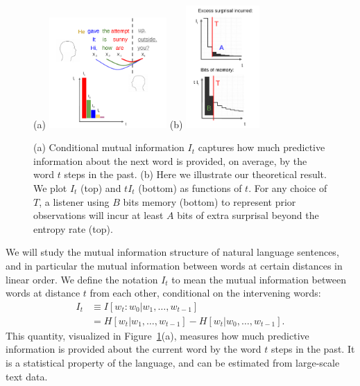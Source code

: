 \begin{figure}
	(a)
\includegraphics[width=0.4\textwidth]{figures-gdrive/mi-distance.pdf}
	(b)
\includegraphics[width=0.25\textwidth]{figures-gdrive/theorem.pdf}
	\caption{
		(a) Conditional mutual information $I_t$ captures how much predictive information about the next word is provided, on average, by the word $t$ steps in the past.
		(b) Here we illustrate our theoretical result. We plot $I_t$ (top) and $tI_t$ (bottom) as functions of $t$. For any choice of $T$, a listener using $B$ bits memory (bottom) to represent prior observations will incur at least $A$ bits of extra surprisal beyond the entropy rate (top). 
}\label{fig:theorem}
\end{figure}





We will study the mutual information structure of natural language sentences, and in particular the mutual information between words at certain distances in linear order. We define the notation $I_t$ to mean the mutual information between words at distance $t$ from each other, conditional on the intervening words:
\begin{align}
    \nonumber
    I_t &\equiv I[w_t : w_0 | w_1, \dots, w_{t-1}] \\
    \nonumber
    &= H[w_t | w_1, \dots, w_{t-1}] - H[w_t | w_0, \dots, w_{t-1}].
\end{align}
This quantity, visualized in Figure~\ref{fig:theorem}(a), measures how much predictive information is provided about the current word by the word $t$ steps in the past.
It is a statistical property of the language, and can be estimated from large-scale text data.

